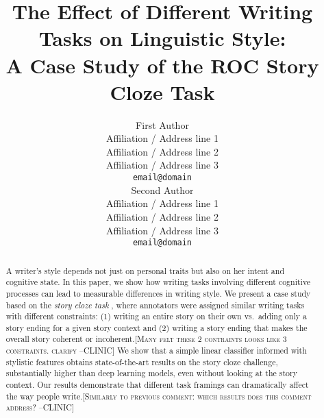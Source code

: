 \documentclass[11pt,a4paper]{article}
\title{The Effect of Different Writing Tasks on Linguistic Style:\\ A Case Study of the ROC Story Cloze Task}
\author{First Author \\
  Affiliation / Address line 1 \\
  Affiliation / Address line 2 \\
  Affiliation / Address line 3 \\
  {\tt email@domain} \\\And
  Second Author \\
  Affiliation / Address line 1 \\
  Affiliation / Address line 2 \\
  Affiliation / Address line 3 \\
  {\tt email@domain} \\
  }
\date{}
\newcommand{\resolved}[1]{}
\newcommand{\nascomment}[1]{{\color{blue}\textsc{[#1 --nas]}}}
\newcommand{\clinic}[1]{{\color{magenta}\textsc{[#1 --CLINIC]}}}
\begin{document}
\maketitle
\begin{abstract}
A writer's style depends not just on personal traits but also on her
intent and cognitive state.
In this paper, we show how writing tasks involving different cognitive processes can lead to measurable differences in writing style. %
We present a case study based on 
the  {\it story cloze task} \cite{Mostafazadeh:2016}, %
where annotators were assigned similar writing tasks with different constraints: (1) writing an entire story on their own vs.~adding only a story ending for a given story context and (2) writing a story ending that makes the overall story coherent or incoherent.\clinic{Many felt these 2 contraints looks like 3 constraints. clarify} 
We show that a simple linear classifier informed with stylistic features obtains 
state-of-the-art results on the story cloze challenge,
substantially higher than  deep learning models,
even without looking at the story context. 
Our results demonstrate that different task framings can dramatically affect the way people write.\clinic{Similarly to previous comment: which results does this comment address?} 
\resolved{They also provide important lessons for designing new NLP
tasks. \nascomment{drop this sentence if we only have a paragraph
  about this at the end, as we currently do}}

\end{abstract}
\end{document}
